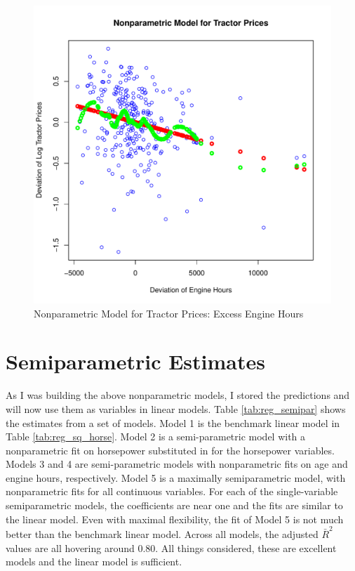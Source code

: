 \documentclass[11pt]{paper}
\begin{document}
\begin{figure}[h!]
  \centering
  \includegraphics[scale = 0.5, keepaspectratio=true]{../Figures/dev_np_vs_eng_dev}
  \caption{Nonparametric Model for Tractor Prices: Excess Engine Hours} \label{fig:dev_np_vs_eng_dev}
\end{figure}

 

\pagebreak
\section{Semiparametric Estimates}

As I was building the above nonparametric models, 
I stored the predictions and will now use them as variables in 
linear models. 
Table \ref{tab:reg_semipar} 
shows the estimates from a set of models. 
Model 1 is the benchmark linear model in 
Table \ref{tab:reg_sq_horse}. 
Model 2 is a semi-parametric model
with a nonparametric fit on horsepower
substituted in for the horsepower variables.
Models 3 and 4 are semi-parametric models
with nonparametric fits on age and engine hours, respectively.
Model 5 is a maximally semiparametric model, 
with nonparametric fits for all continuous variables. 
For each of the single-variable semiparametric models, 
the coefficients are near one
and the fits are similar to the linear model. 
Even with maximal flexibility, the fit of Model 5
is not much better than the benchmark linear model. 
Across all models, the adjusted $\bar{R}^2$ values are all hovering around 0.80. 
All things considered, these are excellent models
and the linear model is sufficient.
\end{document}
